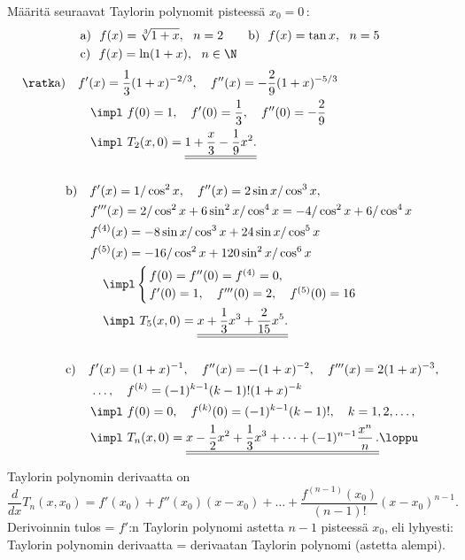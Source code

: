 \begin{Exa} Määritä seuraavat Taylorin polynomit pisteessä $x_0=0\,$:
\begin{align*} 
&\text{a)}\ \ f(x)=\sqrt[3]{1+x},\ \ n=2 \qquad \text{b)}\ \ f(x)=\tan x,\ \ n=5 \\ 
&\text{c)}\ \ f(x)=\ln (1+x),\ \ n \in \N 
\end{align*}
\begin{align*} 
\text{\ratk} \text{a)} 
&\quad f'(x)=\frac{1}{3}(1+x)^{-2/3}, \quad f''(x)=-\frac{2}{9}(1+x)^{-5/3} \\
&\quad\quad\impl\ f(0)=1,\quad f'(0)=\frac{1}{3},\quad f''(0)=-\frac{2}{9} \\
&\quad\quad\impl\ T_2(x,0)=\underline{\underline{1+\frac{x}{3}-\frac{1}{9}x^2.}}\\ \\
&\text{b)} \quad f'(x)=1/\cos^2 x, \quad f''(x)=2\sin x/\cos^3 x, \\
&\quad\quad f'''(x)= 2/\cos^2 x+6\sin^2 x/\cos^4 x=-4/\cos^2 x + 6/\cos^4 x \\
&\quad\quad f^{(4)}(x)=-8\sin x/\cos^3 x+24\sin x/\cos^5 x \\
&\quad\quad f^{(5)}(x)=-16/\cos^2 x+120\sin^2 x/\cos^6 x \\ 
&\quad\quad\quad\impl \begin{cases} 
                      \,f(0)=f''(0)=f^{(4)}=0, \\ 
                      \,f'(0)=1,\quad f'''(0)=2,\quad f^{(5)}(0)=16 
                      \end{cases} \\
&\quad\quad\quad\impl\ T_5(x,0)=\underline{\underline{x+\frac{1}{3}x^3+\frac{2}{15}x^5.}} \\ \\
&\text{c)} \quad f'(x)=(1+x)^{-1}, \quad f''(x)=-(1+x)^{-2},\quad f'''(x)=2(1+x)^{-3},\\
&\quad\quad\ldots,\quad f^{(k)}=(-1)^{k-1}(k-1)!(1+x)^{-k} \\
&\quad\quad\impl \ f(0)=0,\quad f^{(k)}(0)= (-1)^{k-1}(k-1)!,\quad k=1,2,\ldots, \\
&\quad\quad\impl \ T_n(x,0)
  =\underline{\underline{x-\frac{1}{2}x^2+\frac{1}{3}x^3+\cdots +(-1)^{n-1}\frac{x^n}{n}\,.}} 
                                                                                       \loppu
\end{align*}
\end{Exa}
Taylorin polynomin derivaatta on
\[
\frac{d}{dx} T_n(x,x_0) = f'(x_0) + f''(x_0)(x-x_0) + \ldots 
                                  + \frac{f^{(n-1)}(x_0)}{(n-1)!}(x-x_0)^{n-1}.
\]
Derivoinnin tulos = $f'$:n Taylorin polynomi astetta $n-1$ pisteessä $x_0$, eli lyhyesti:
Taylorin polynomin derivaatta = derivaatan Taylorin polynomi (astetta alempi).

